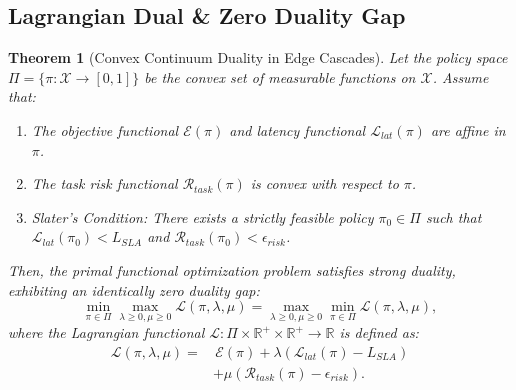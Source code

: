 \documentclass[conference]{IEEEtran}
\newtheorem{theorem}{Theorem}
\begin{document}
\subsection{Lagrangian Dual \& Zero Duality Gap}
\begin{theorem}[Convex Continuum Duality in Edge Cascades]
\label{thm:zero_duality_gap}
Let the policy space $\Pi = \{\pi: \mathcal{X} \to [0, 1]\}$ be the convex set of measurable functions on $\mathcal{X}$. Assume that:
\begin{enumerate}
    \item The objective functional $\mathcal{E}(\pi)$ and latency functional $\mathcal{L}_{lat}(\pi)$ are affine in $\pi$.
    \item The task risk functional $\mathcal{R}_{task}(\pi)$ is convex with respect to $\pi$.
    \item Slater's Condition: There exists a strictly feasible policy $\pi_0 \in \Pi$ such that $\mathcal{L}_{lat}(\pi_0) < L_{SLA}$ and $\mathcal{R}_{task}(\pi_0) < \epsilon_{risk}$.
\end{enumerate}
Then, the primal functional optimization problem satisfies strong duality, exhibiting an identically zero duality gap:
\begin{equation}
\min_{\pi \in \Pi} \max_{\lambda \ge 0, \mu \ge 0} \mathcal{L}(\pi, \lambda, \mu) = \max_{\lambda \ge 0, \mu \ge 0} \min_{\pi \in \Pi} \mathcal{L}(\pi, \lambda, \mu),
\end{equation}
where the Lagrangian functional $\mathcal{L}: \Pi \times \mathbb{R}^+ \times \mathbb{R}^+ \to \mathbb{R}$ is defined as:
\begin{equation}
\begin{split}
\mathcal{L}(\pi, \lambda, \mu) = &\,\mathcal{E}(\pi) + \lambda \left( \mathcal{L}_{lat}(\pi) - L_{SLA} \right) \\
&+ \mu \left( \mathcal{R}_{task}(\pi) - \epsilon_{risk} \right).
\end{split}
\end{equation}
\end{theorem}
\end{document}
